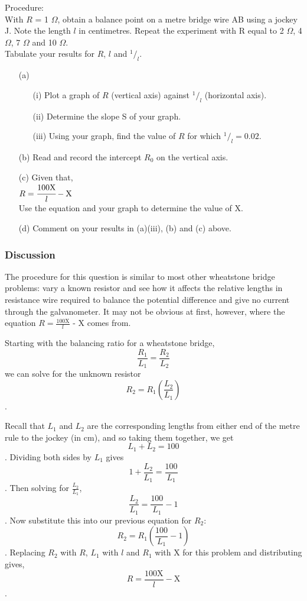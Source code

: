 Procedure:\\

With $R$ = 1 $\Omega$, obtain a balance point on a metre bridge wire AB using a jockey J. Note the length $l$ in centimetres. Repeat the experiment with R equal to 2 $\Omega$, 4 $\Omega$, 7 $\Omega$ and 10 $\Omega$.\\

Tabulate your results for $R$, $l$ and $^1/_l$.

\begin{itemize}
\item[(a)]
\begin{itemize}
\item[(i)] Plot a graph of $R$ (vertical axis) against $^1/_l$ (horizontal axis).
\item[(ii)] Determine the slope S of your graph.
\item[(iii)] Using your graph, find the value of $R$ for which $^1/_l = 0.02$.
\end{itemize}
\item[(b)] Read and record the intercept $R_0$ on the vertical axis.
\item[(c)] Given that,\\
\quad \quad $R = \cfrac{100 \text{X}}{l} - \text{X}$\\
Use the equation and your graph to determine the value of X.
\item[(d)] Comment on your results in (a)(iii), (b) and (c) above.
\end{itemize}

\subsubsection{Discussion}
The procedure for this question is similar to most other wheatstone bridge problems: vary a known resistor and see how it affects the relative lengths in resistance wire required to balance the potential difference and give no current through the galvanometer. It may not be obvious at first, however, where the equation $R = \frac{100 \text{X}}{l}$ - X comes from.

Starting with the balancing ratio for a wheatstone bridge, $$ \frac{R_1}{L_1} = \frac{R_2}{L_2} $$ we can solve for the unknown resistor $$R_2 = R_1\left(\frac{L_2}{L_1}\right)$$. 

Recall that $L_1$ and $L_2$ are the corresponding lengths from either end of the metre rule to the jockey (in cm), and so taking them together, we get $$L_1 + L_2 = 100$$. Dividing both sides by $L_1$ gives $$1 + \frac{L_2}{L_1} = \frac{100}{L_1}$$. Then solving for $\frac{L_2}{L_1}$, $$\frac{L_2}{L_1} = \frac{100}{L_1} - 1$$. Now substitute this into our previous equation for $R_2$: $$R_2 = R_1\left(\frac{100}{L_1} - 1\right)$$. Replacing $R_2$ with $R$, $L_1$ with $l$ and $R_1$ with X for this problem and distributing gives, $$R = \frac{100 \text{X}}{l} - \text{X}$$.


